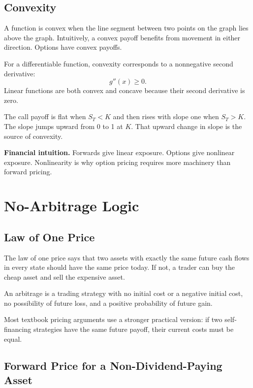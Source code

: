 \subsection{Convexity}

A function is convex when the line segment between two points on the graph lies
above the graph. Intuitively, a convex payoff benefits from movement in either
direction. Options have convex payoffs.

For a differentiable function, convexity corresponds to a nonnegative second
derivative:
\[
    g''(x)\geq 0.
\]
Linear functions are both convex and concave because their second derivative is
zero.

\begin{exmp}
The call payoff is flat when $S_T<K$ and then rises with slope one when $S_T>K$.
The slope jumps upward from 0 to 1 at $K$. That upward change in slope is the
source of convexity.
\end{exmp}

\begin{boxF}
\textbf{Financial intuition.} Forwards give linear exposure. Options give
nonlinear exposure. Nonlinearity is why option pricing requires more machinery
than forward pricing.
\end{boxF}

\section{No-Arbitrage Logic}

\subsection{Law of One Price}

The law of one price says that two assets with exactly the same future cash
flows in every state should have the same price today. If not, a trader can buy
the cheap asset and sell the expensive asset.

\begin{defN}[Arbitrage]
An arbitrage is a trading strategy with no initial cost or a negative initial
cost, no possibility of future loss, and a positive probability of future gain.
\end{defN}

Most textbook pricing arguments use a stronger practical version: if two
self-financing strategies have the same future payoff, their current costs must
be equal.

\subsection{Forward Price for a Non-Dividend-Paying Asset}

